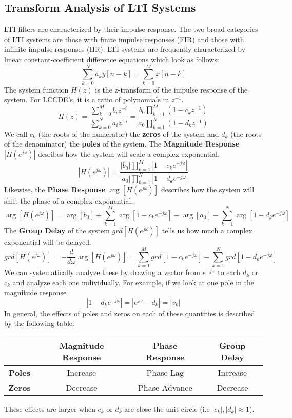 \documentclass{article}
\begin{document}
\subsection{Transform Analysis of LTI Systems}
LTI filters are characterized by their impulse response. The two broad categories of LTI systems are those with finite impulse responses (FIR) and those with infinite impulse responses (IIR).
LTI systems are frequently characterized by linear constant-coefficient difference equations which look as follows:
$$\sum_{k=0}^{N}a_ky[n-k] = \sum_{k=0}^Mx[n-k]$$
The system function $H(z)$ is the z-transform of the impulse response of the system. For LCCDE's, it is a ratio of polynomials in $z^{-1}$.
$$H(z) = \frac{\sum_{k=0}^Mb_iz^{-i}}{\sum_{k=0}^Na_iz^{-i}} = \frac{b_0\prod_{k=1}^M(1-c_kz^{-1})}{a_0\prod_{k=1}^N(1-d_kz^{-1})}$$
We call $c_k$ (the roots of the numerator) the \textbf{zeros} of the system and $d_k$ (the roots of the denominator) the \textbf{poles} of the system.
The \textbf{Magnitude Response} $|H(e^{j\omega})|$ desribes how the system will scale a complex exponential.
$$|H(e^{j\omega})| = \frac{|b_0|\prod_{k=1}^M|1-c_ke^{-j\omega}|}{|a_0|\prod_{k=1}^N|1-d_ke^{-j\omega}|}$$
Likewise, the \textbf{Phase Response} $\arg[H(e^{j\omega})]$ describes how the system will shift the phase of a complex exponential.
$$\arg[H(e^{j\omega})] = \arg[b_0]+\sum_{k=1}^{M}\arg[1-c_ke^{-j\omega}] - \arg[a_0] - \sum_{k=1}^{N}\arg[1-d_ke^{-j\omega}]$$
The \textbf{Group Delay} of the system $grd[H(e^{j\omega})]$ tells us how much a complex exponential will be delayed.
$$grd[H(e^{j\omega})] = -\frac{d}{d\omega}\arg[H(e^{j\omega})] = \sum_{k=1}^{M}grd[1-c_ke^{-j\omega}] - \sum_{k=1}^{N}grd[1-d_ke^{-j\omega}]$$
We can systematically analyze these by drawing a vector from $e^{-j\omega}$ to each $d_k$ or $c_k$ and analyze each one individually.
For example, if we look at one pole in the magnitude response
$$|1-d_ke^{-j\omega}| = |e^{j\omega}-d_k| = |v_k|$$
In general, the effects of poles and zeros on each of these quantities is described by the following table.
\begin{center}
  \begin{tabular}{|c|c|c|c|}
    \hline
    & \textbf{Magnitude Response} & \textbf{Phase Response} & \textbf{Group Delay}\\
    \hline
    \textbf{Poles} & Increase & Phase Lag & Increase\\
    \hline
    \textbf{Zeros} & Decrease & Phase Advance & Decrease\\
    \hline
  \end{tabular}
\end{center}
These effects are larger when $c_k$ or $d_k$ are close the unit circle (i.e $|c_k|, |d_k|\approx 1$).
\end{document}
